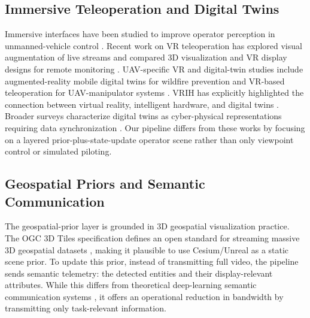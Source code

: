 \documentclass[fleqn]{VRIH2025}
\begin{document}
\subsection{Immersive Teleoperation and Digital Twins}
Immersive interfaces have been studied to improve operator perception in unmanned-vehicle control \cite{fabris2021immersive, roldan2017multirobot}. Recent work on VR teleoperation has explored visual augmentation of live streams \cite{luo2024visual} and compared 3D visualization and VR display designs for remote monitoring \cite{buchner2025remote}. UAV-specific VR and digital-twin studies include augmented-reality mobile digital twins for wildfire prevention \cite{costa2025ardigitaltwin} and VR-based teleoperation for UAV-manipulator systems \cite{yang2025uavmanipulator}. VRIH has explicitly highlighted the connection between virtual reality, intelligent hardware, and digital twins \cite{lv2022vrihdt}. Broader surveys characterize digital twins as cyber-physical representations requiring data synchronization \cite{jones2020dt, barricelli2019dt, singh2021dt}. Our pipeline differs from these works by focusing on a layered prior-plus-state-update operator scene rather than only viewpoint control or simulated piloting.

\subsection{Geospatial Priors and Semantic Communication}
The geospatial-prior layer is grounded in 3D geospatial visualization practice. The OGC 3D Tiles specification defines an open standard for streaming massive 3D geospatial datasets \cite{ogc2022threedtiles}, making it plausible to use Cesium/Unreal as a static scene prior. To update this prior, instead of transmitting full video, the pipeline sends semantic telemetry: the detected entities and their display-relevant attributes. While this differs from theoretical deep-learning semantic communication systems \cite{luo2022semantic, xie2021semantic, shao2022edgeinference}, it offers an operational reduction in bandwidth by transmitting only task-relevant information.
\end{document}
